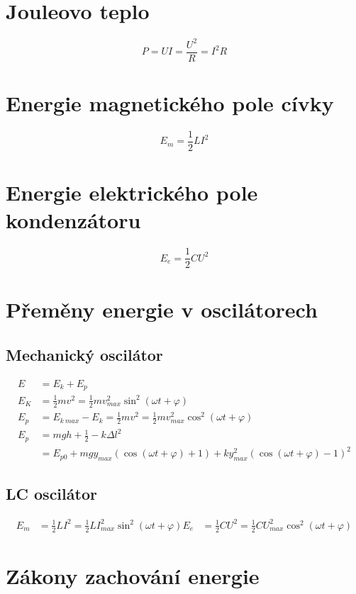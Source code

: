 \documentclass[titlepage]{book}
\begin{document}
\section{Jouleovo teplo}
\begin{equation}
P = UI = \frac{U^2}{R} = I^2R
\end{equation}
\section{Energie magnetického pole cívky}
\begin{equation}
E_m = \frac{1}{2} L I^2
\end{equation}
\section{Energie elektrického pole kondenzátoru}
\begin{equation}
E_e = \frac{1}{2} C U^2
\end{equation}
\section{Přeměny energie v oscilátorech}
\subsection{Mechanický oscilátor}
\begin{align}
E &= E_k + E_p\\
E_K &= \frac{1}{2}mv^2 = \frac{1}{2} m v_{max}^2 \sin^2(\omega t + \varphi)\\
E_p &= E_{k \ max} - E_k = \frac{1}{2}mv^2 = \frac{1}{2} m v_{max}^2 \cos^2(\omega t + \varphi)\\
E_p &= mgh + \frac{1}{2} - k \Delta l^2\\
&= E_{p0} + mg y_{max} (\cos(\omega t + \varphi) + 1) + k y_{max}^2 (\cos(\omega t + \varphi) - 1)^2
\end{align}
\subsection{LC oscilátor}
\begin{align}
E_m &= \frac{1}{2} L I^2 = \frac{1}{2} L I_{max}^2 \sin^2(\omega t + \varphi)
E_e &= \frac{1}{2} C U^2 = \frac{1}{2} C U_{max}^2 \cos^2(\omega t + \varphi)
\end{align}
\section{Zákony zachování energie}
\end{document}
